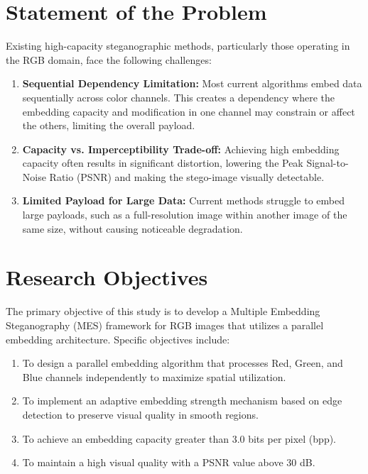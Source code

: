\section{Statement of the Problem}
Existing high-capacity steganographic methods, particularly those operating in the RGB domain, face the following challenges:
\begin{enumerate}
    \item \textbf{Sequential Dependency Limitation:} Most current algorithms embed data sequentially across color channels. This creates a dependency where the embedding capacity and modification in one channel may constrain or affect the others, limiting the overall payload.
    \item \textbf{Capacity vs. Imperceptibility Trade-off:} Achieving high embedding capacity often results in significant distortion, lowering the Peak Signal-to-Noise Ratio (PSNR) and making the stego-image visually detectable.
    \item \textbf{Limited Payload for Large Data:} Current methods struggle to embed large payloads, such as a full-resolution image within another image of the same size, without causing noticeable degradation.
\end{enumerate}

\section{Research Objectives}
The primary objective of this study is to develop a Multiple Embedding Steganography (MES) framework for RGB images that utilizes a parallel embedding architecture.
Specific objectives include:
\begin{enumerate}
    \item To design a parallel embedding algorithm that processes Red, Green, and Blue channels independently to maximize spatial utilization.
    \item To implement an adaptive embedding strength mechanism based on edge detection to preserve visual quality in smooth regions.
    \item To achieve an embedding capacity greater than 3.0 bits per pixel (bpp).
    \item To maintain a high visual quality with a PSNR value above 30 dB.
\end{enumerate}

